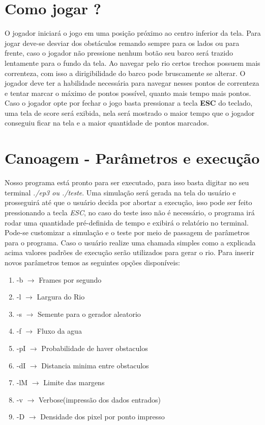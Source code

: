 \documentclass[a4paper,11pt]{article}
\begin{document}
\section{Como jogar ?}
O jogador iniciará o jogo em uma posi\c{c}ão próximo ao centro inferior da tela. Para jogar deve-se desviar dos obstáculos remando sempre para os lados ou para frente, caso o jogador não pressione nenhum botão seu barco será trazido lentamente para o fundo da tela. Ao navegar pelo rio certos trechos possuem mais correnteza, com isso a dirigibilidade do barco pode bruscamente se alterar. O jogador deve ter a habilidade necessária para navegar nesses pontos de correnteza e tentar marcar o máximo de pontos possível, quanto mais tempo mais pontos.
Caso o jogador opte por fechar o jogo basta pressionar a tecla \textbf{ESC} do teclado, uma tela de score será exibida, nela será mostrado o maior tempo que o jogador conseguiu ficar na tela e a maior quantidade de pontos marcados.


\section{Canoagem - Parâmetros e execu\c{c}ão}
Nosso programa está pronto para ser executado, para isso basta digitar no seu terminal \textit{./ep3 ou ./teste}. Uma simulação será gerada na tela do usuário e prosseguirá até que o usuário decida por abortar a execu\c{c}ão, isso pode ser feito pressionando a tecla \textit{ESC}, no caso do teste isso não é necessário, o programa irá rodar uma quantidade pré-definida de tempo e exibirá o relatório no terminal.
Pode-se customizar a simula\c{c}ão e o teste por meio de passagem de parâmetros para o programa. Caso o usuário realize uma chamada simples como a explicada acima valores padrões de execu\c{c}ão serão utilizados para gerar o rio. Para inserir novos parâmetros temos as seguintes op\c{c}ões disponíveis:

\begin{enumerate}
\item[]{-b  $\rightarrow$ Frames por segundo}
\item[]{-l  $\rightarrow$ Largura do Rio}
\item[]{-s  $\rightarrow$ Semente para o gerador aleatorio}
\item[]{-f  $\rightarrow$ Fluxo da agua}
\item[]{-pI $\rightarrow$ Probabilidade de haver obstaculos}
\item[]{-dI $\rightarrow$ Distancia minima entre obstaculos}
\item[]{-lM $\rightarrow$ Limite das margens}
\item[]{-v  $\rightarrow$ Verbose(impressão dos dados entrados)}
\item[]{-D  $\rightarrow$ Densidade dos pixel por ponto impresso}



\end{enumerate}
\end{document}
